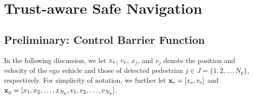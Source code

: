 \documentclass[journal]{IEEEtran}
\begin{document}



\section{Trust-aware Safe Navigation}
\label{section-control}
\subsection{Preliminary: Control Barrier Function}
In the following discussion, we let 
$x_{\rm e}$, $v_{\rm e}$, $x_j$, and $v_j$ denote the position and velocity of the ego vehicle and those of detected pedestrian $j \in J=\{1,2,\ldots, N_p\}$, respectively. 
For simplicity of notation, we further let 
$\mathbf{x}_{\rm e}=[x_{\rm e}, v_{\rm e}]$ and
$\mathbf{x}_{\rm p}=[x_1, x_2, \hdots, x_{N_p}, v_1, v_2, \hdots, v_{N_p}]$.
\end{document}
